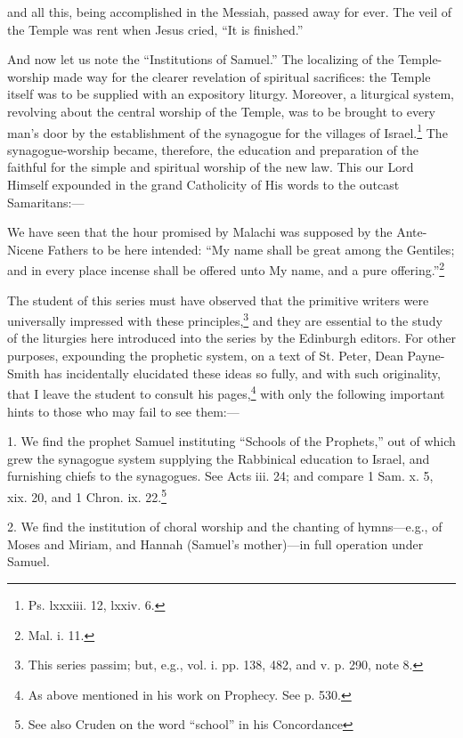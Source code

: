 and all this, being accomplished in the Messiah, passed away for ever. The veil of the Temple was rent when Jesus cried, “It is finished.”

And now let us note the “Institutions of Samuel.” The localizing of the Temple-worship made way for the clearer revelation of spiritual sacrifices: the Temple itself was to be supplied with an expository liturgy. Moreover, a liturgical system, revolving about the central worship of the Temple, was to be brought to every man’s door by the establishment of the synagogue for the villages of Israel.\footnote{\par  Ps. lxxxiii. 12, lxxiv. 6.} The synagogue-worship became, therefore, the education and preparation of the faithful for the simple and spiritual worship of the new law. This our Lord Himself expounded in the grand Catholicity of His words to the outcast Samaritans:—

We have seen that the hour promised by Malachi was supposed by the Ante-Nicene Fathers to be here intended: “My name shall be great among the Gentiles; and in every place incense shall be offered unto My name, and a pure offering.”\footnote{\par  Mal. i. 11.}

The student of this series must have observed that the primitive writers were universally impressed with these principles,\footnote{\par  This series passim; but, e.g., vol. i. pp. 138, 482, and v. p. 290, note 8.} and they are essential to the study of the liturgies here introduced into the series by the Edinburgh editors. For other purposes, expounding the prophetic system, on a text of St. Peter, Dean Payne-Smith has incidentally elucidated these ideas so fully, and with such originality, that I leave the student to consult his pages,\footnote{\par  As above mentioned in his work on Prophecy. See p. 530.} with only the following important hints to those who may fail to see them:—

1. We find the prophet Samuel instituting “Schools of the Prophets,” out of which grew the synagogue system supplying the Rabbinical education to Israel, and furnishing chiefs to the synagogues. See Acts iii. 24; and compare 1 Sam. x. 5, xix. 20, and 1 Chron. ix. 22.\footnote{\par  See also Cruden on the word “school” in his Concordance}

2. We find the institution of choral worship and the chanting of hymns—e.g., of Moses and Miriam, and Hannah (Samuel’s mother)—in full operation under Samuel.

